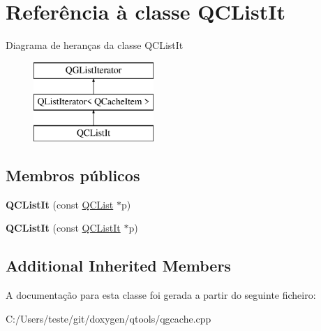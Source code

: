 \hypertarget{class_q_c_list_it}{\section{Referência à classe Q\-C\-List\-It}
\label{class_q_c_list_it}
}
Diagrama de heranças da classe Q\-C\-List\-It\begin{figure}[H]
\begin{center}
\leavevmode
\includegraphics[height=3.000000cm]{class_q_c_list_it}
\end{center}
\end{figure}
\subsection*{Membros públicos}
\begin{DoxyCompactItemize}
\item 
\hypertarget{class_q_c_list_it_aac3cd4370876b09bc9ea721a80a81f03}{{\bfseries Q\-C\-List\-It} (const \hyperlink{class_q_c_list}{Q\-C\-List} $\ast$p)}\label{class_q_c_list_it_aac3cd4370876b09bc9ea721a80a81f03}

\item 
\hypertarget{class_q_c_list_it_a80c8e40d26b7661c3d38299956e715d4}{{\bfseries Q\-C\-List\-It} (const \hyperlink{class_q_c_list_it}{Q\-C\-List\-It} $\ast$p)}\label{class_q_c_list_it_a80c8e40d26b7661c3d38299956e715d4}

\end{DoxyCompactItemize}
\subsection*{Additional Inherited Members}


A documentação para esta classe foi gerada a partir do seguinte ficheiro\-:\begin{DoxyCompactItemize}
\item 
C\-:/\-Users/teste/git/doxygen/qtools/qgcache.\-cpp\end{DoxyCompactItemize}
